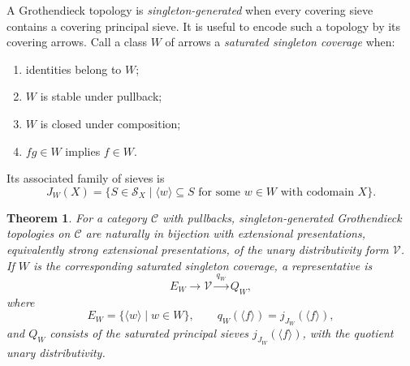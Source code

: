 \documentclass[12pt,oneside,reqno]{amsart}
\newtheorem{theorem}{Theorem}[section]
\theoremstyle{definition}
\theoremstyle{remark}
\newcommand{\C}{\mathcal C}
\newcommand{\Sieve}{\mathscr S}
\newcommand{\Var}{\mathscr V}
\newcommand{\prin}[1]{\langle #1\rangle}
\begin{document}
A Grothendieck topology is \emph{singleton-generated} when every
covering sieve contains a covering principal sieve.  It is useful to
encode such a topology by its covering arrows.  Call a class \(W\) of
arrows a \emph{saturated singleton coverage} when:
\begin{enumerate}[label=\textup{(S\arabic*)}]
\item identities belong to \(W\);
\item \(W\) is stable under pullback;
\item \(W\) is closed under composition;
\item \(fg\in W\) implies \(f\in W\).
\end{enumerate}
Its associated family of sieves is
\[
 J_W(X)=\{S\in\Sieve_X\mid
   \prin w\subseteq S\text{ for some }w\in W
   \text{ with codomain }X\}.
\]

\begin{theorem}\label{thm:singleton-topologies}
For a category \(\C\) with pullbacks, singleton-generated
Grothendieck topologies on \(\C\) are naturally in bijection with
extensional presentations, equivalently strong extensional
presentations, of the unary distributivity form \(\Var\).  If \(W\) is
the corresponding saturated singleton coverage, a representative is
\begin{equation}\label{eq:variation-short-exact}
 E_W\longrightarrow\Var
 \xrightarrow{\,q_W\,}Q_W,
\end{equation}
where
\[
 E_W=\{\prin w\mid w\in W\},
 \qquad
 q_W(\prin f)=j_{J_W}(\prin f),
\]
and \(Q_W\) consists of the saturated principal sieves
\(j_{J_W}(\prin f)\), with the quotient unary distributivity.
\end{theorem}
\end{document}
